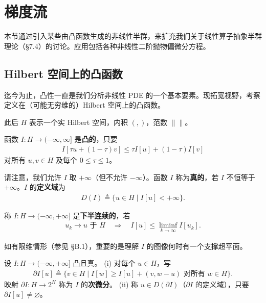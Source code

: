 \documentclass[../../main.tex]{subfiles}
\begin{document}
\section{梯度流}\label{section:ch09-6-梯度流}

本节通过引入某些由凸函数生成的非线性半群，来扩充我们关于线性算子抽象半群理论（\S7.4）的讨论。应用包括各种非线性二阶抛物偏微分方程。

\subsection{Hilbert 空间上的凸函数}\label{subsection:ch09-6-1-Hilbert凸函数}

迄今为止，凸性一直是我们分析非线性 PDE 的一个基本要素。现拓宽视野，考察定义在（可能无穷维的）Hilbert 空间上的凸函数。

此后 $H$ 表示一个实 Hilbert 空间，内积 $(,)$，范数 $\|\|$。

\begin{definition}\label{definition:ch09-6-凸函数}
函数 $I:H\to(-\infty,\infty]$ 是\textbf{凸的}，只要
\begin{align*}
I[\tau u+(1-\tau)v]\leqslant\tau I[u]+(1-\tau)I[v]
\end{align*}
对所有 $u,v\in H$ 及每个 $0\leqslant\tau\leqslant 1$。
\end{definition}

请注意，我们允许 $I$ 取 $+\infty$（但不允许 $-\infty$）。函数 $I$ 称为\textbf{真的}，若 $I$ 不恒等于 $+\infty$。$I$ 的\textbf{定义域}为
\begin{align*}
D(I)\triangleq\{u\in H\mid I[u]<+\infty\}.
\end{align*}

\begin{definition}\label{definition:ch09-6-下半连续}
称 $I:H\to(-\infty,+\infty]$ 是\textbf{下半连续的}，若
\begin{align*}
u_k\to u\text{ 于 }H\quad\Longrightarrow\quad I[u]\leqslant\liminf_{k\to\infty}I[u_k].
\end{align*}
\end{definition}

如有限维情形（参见 \S B.1），重要的是理解 $I$ 的图像何时有一个支撑超平面。

\begin{definition}\label{definition:ch09-6-次微分}
设 $I:H\to(-\infty,+\infty]$ 凸且真。
(i) 对每个 $u\in H$，写
\begin{align}
\partial I[u]\triangleq\{v\in H\mid I[w]\geqslant I[u]+(v,w-u)\text{ 对所有 }w\in H\}.\label{align:ch09-6-eq01}
\end{align}
映射 $\partial I:H\to 2^H$ 称为 $I$ 的\textbf{次微分}。
(ii) 称 $u\in D(\partial I)$（$\partial I$ 的定义域），只要 $\partial I[u]\neq\varnothing $。
\end{definition}
\end{document}
